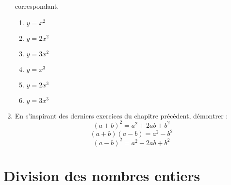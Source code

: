 \documentclass[12 pt]{report}
\theoremstyle{plain}
\newcounter{n}
\begin{document}
\begin{enumerate}
 correspondant. \begin{enumerate}
 \item $y = x^2$
 \item $y = 2x^2$ 
 \item $y = 3x^2$ 
 \item $y = x^3$
 \item $y = 2x^3$
 \item $y = 3x^3$
 \end{enumerate}
 \item En s'inspirant des derniers exercices du 
 chapitre précédent, démontrer : 
 \[ (a + b)^2 = a^2 + 2ab + b^2\]
 \[ (a + b)(a - b) = a^2 - b^2\]
 \[ (a - b)^2 = a^2 - 2ab + b^2\]
\end{enumerate} 
 
 
 \chapter{Division des nombres entiers}
\end{document}
